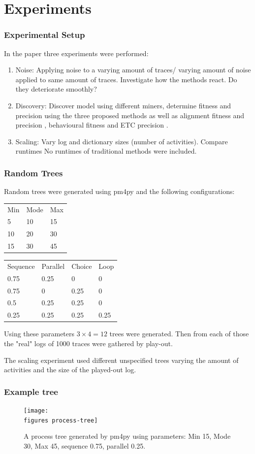 \documentclass{beamer}
\newcommand{\figures}{../figures/}
\begin{document}
	\section{Experiments}
	\begin{frame}
		\frametitle{Experimental Setup}
		In the paper three experiments were performed:
		\begin{enumerate}
			\item Noise: Applying noise to a varying amount of traces/ varying amount of noise applied to same amount of traces. Investigate how the methods react. Do they deteriorate smoothly?
			\item Discovery: Discover model using different miners, determine fitness and precision using the three proposed methods as well as alignment fitness and precision \cite{Aals16}, behavioural fitness \cite{GMVB09} and ETC precision \cite{MuCa10}.
			\item Scaling: Vary log and dictionary sizes (number of activities). Compare runtimes \alert{No runtimes of traditional methods were included.}
		\end{enumerate}
	\end{frame}
	\begin{frame}
		\frametitle{Random Trees}
		Random trees were generated using pm4py and the following configurations:
		
		\begin{center}
		\begin{tabular}{lll}
			Min & Mode & Max \\
			5 & 10 & 15 \\
			10 & 20 & 30 \\
			15 & 30 & 45 \\
		\end{tabular}
	\hspace{40pt}
		\begin{tabular}{llll}
			Sequence & Parallel & Choice & Loop \\
			0.75 & 0.25 & 0 & 0 \\
			0.75 & 0 & 0.25 & 0 \\
			0.5 & 0.25 & 0.25 & 0 \\
			0.25 & 0.25 & 0.25 & 0.25 \\
		\end{tabular}
	\end{center}

		Using these parameters $3\times4=12$ trees were generated.
		Then from each of those the "real" logs of 1000 traces were gathered by play-out.
		
		The scaling experiment used different unspecified trees varying the amount of activities and the size of the played-out log.
	\end{frame}
	\begin{frame}
		\frametitle{Example tree}
		\begin{figure}
			\texttt{[image: \\figures process-tree]}
			\caption{A process tree generated by pm4py using parameters: Min 15, Mode 30, Max 45, sequence 0.75, parallel 0.25. }
			\label{fig:process-tree}
		\end{figure}
	\end{frame}
	
\end{document}
